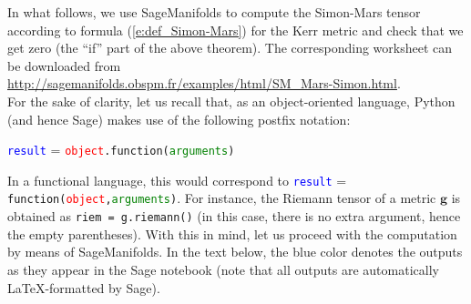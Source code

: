 \documentclass[a4paper]{jpconf}
\newcommand{\soft}[1]{\textsf{#1}}
\newcommand{\Sage}{\soft{Sage}}
\newcommand{\SM}{\soft{SageManifolds}}
\newcommand{\w}[1]{\bm{#1}}
\begin{document}
In what follows, we use \SM{} to compute the Simon-Mars tensor 
according to formula (\ref{e:def_Simon-Mars}) for the Kerr metric and check 
that we get zero (the ``if'' part of the above theorem). 
The corresponding worksheet can be downloaded from \\
\url{http://sagemanifolds.obspm.fr/examples/html/SM_Mars-Simon.html}.\\
For the sake of clarity, let us recall that, 
as an object-oriented language, Python (and hence \Sage{}) makes use of 
the following postfix notation:
\begin{center}
\textcolor{blue}{\texttt{result}} = \textcolor{red}{\texttt{object}}\texttt{.}\texttt{function(}\textcolor{green}{\texttt{arguments}}\texttt{)}
\end{center}
In a functional language, this would correspond to 
\textcolor{blue}{\texttt{result}} = \texttt{function(}\textcolor{red}{\texttt{object}}\texttt{,}\textcolor{green}{\texttt{arguments}}\texttt{)}.
For instance, the Riemann tensor of a metric $\w{g}$ is obtained as 
\verb+riem = g.riemann()+
(in this case, there is no extra argument, hence the empty parentheses). 
With this in mind, let us proceed with the computation by means of 
\SM{}. In the text below, the blue color denotes the outputs as they appear in
the \Sage{} notebook (note that all outputs are automatically
\LaTeX{}-formatted by \Sage).
\end{document}
